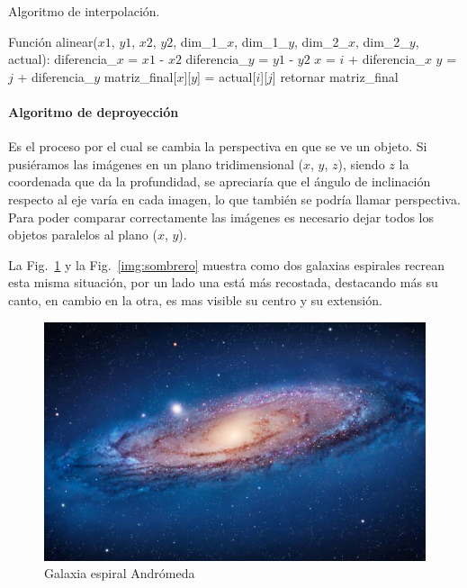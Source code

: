 \begin{algorithm}
\caption{Algoritmo de interpolación.}\label{alg:interpolacion}
\label{alg:escalamiento}
\begin{algorithmic}[1]
\STATE Función alinear($x1$, $y1$, $x2$, $y2$, dim\_1\_$x$, dim\_1\_$y$, dim\_2\_$x$, dim\_2\_$y$, actual): 
\STATE diferencia\_$x$ = $x1$ - $x2$
\STATE diferencia\_$y$ = $y1$ - $y2$
\STATE $x$ = $i$ + diferencia\_$x$
\STATE $y$ = $j$ + diferencia\_$y$
\STATE matriz\_final[$x$][$y$] = actual[$i$][$j$]
\ENDIF
\ENDWHILE
\ENDWHILE
\STATE retornar matriz\_final
\end{algorithmic}
\end{algorithm}

\paragraph{Algoritmo de deproyección}

Es el proceso por el cual se cambia la perspectiva en que se ve un
objeto. Si pusiéramos las imágenes  en un plano tridimensional ($x$, $y$,
$z$), siendo $z$ la coordenada que da la profundidad, se apreciaría que
el ángulo de inclinación respecto al eje varía en cada imagen, lo que
también se podría llamar perspectiva. Para poder comparar
correctamente las imágenes es necesario dejar todos los objetos
paralelos al plano ($x$, $y$).

La Fig.~\ref{img:andromeda} y la Fig.~\ref{img:sombrero} muestra como
dos galaxias espirales recrean esta misma situación, por un lado una
está más recostada, destacando más su canto, en cambio en la otra, es
mas visible su centro y su extensión.

\begin{figure}[hb!]
  \begin{center}
    \includegraphics[scale=1]{image/andromeda}
  \end{center}
  \caption{Galaxia espiral Andrómeda}\label{img:andromeda}
\end{figure}

